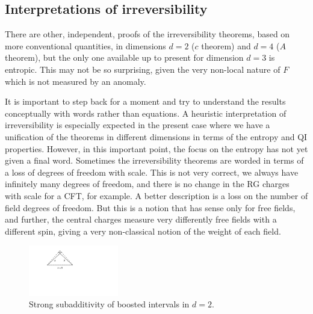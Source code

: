 \documentclass[12pt]{article}
\numberwithin{equation}{section}
\begin{document}
\subsection{Interpretations of irreversibility}
There are other, independent, proofs of the irreversibility theorems, based on more conventional quantities,  in dimensions $d=2$ ($c$ theorem) and $d=4$ ($A$ theorem), but the only one available up to present for dimension $d=3$ is entropic. This may not be so surprising, given the very non-local nature of $F$ which is not measured by an anomaly. 

It is important to step back for a moment and try to understand the results conceptually with words rather than equations. A heuristic interpretation of irreversibility is especially expected in the present case where we have a unification of the theorems in different dimensions in terms of the entropy and QI properties. However, in this important point, the focus on the entropy has not yet given a final word. 
Sometimes the irreversibility theorems are worded in terms of a loss of degrees of freedom with scale. This is not very correct, we always have infinitely many degrees of freedom, and there is no change in the RG charges with scale for a CFT, for example. A better description is a loss on the number of field degrees of freedom. But this is a notion that has sense only for free fields, and further, the central charges measure very differently free fields with a different spin, giving a very non-classical notion of the weight of each field.   

\begin{figure}[t]
\begin{center}
\includegraphics[width=0.35\textwidth]{triangulo.pdf} 
\caption{Strong subadditivity of boosted intervals in $d=2$.}
\label{triangle}
\end{center}
\end{figure}
\end{document}

